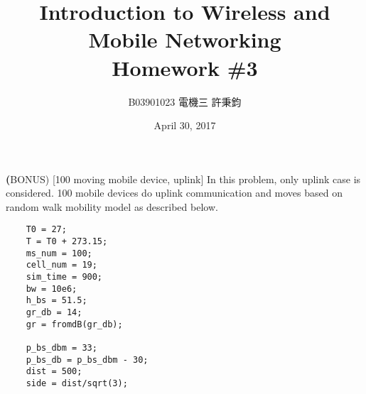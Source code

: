 \documentclass{article}
\title{Introduction to Wireless and Mobile Networking\\ Homework \#3}
\author{B03901023 電機三 許秉鈞}
\date{April 30, 2017} %
\begin{document}
\maketitle

\textbf(BONUS) [100 moving mobile device, uplink] In this problem, only uplink case is considered. 100 mobile devices do uplink communication and moves based on random walk mobility model as described below.

\begin{lstlisting}
    T0 = 27;
    T = T0 + 273.15;
    ms_num = 100;
    cell_num = 19;
    sim_time = 900;
    bw = 10e6;
    h_bs = 51.5;
    gr_db = 14;
    gr = fromdB(gr_db);

    p_bs_dbm = 33;
    p_bs_db = p_bs_dbm - 30;
    dist = 500;
    side = dist/sqrt(3);
\end{lstlisting}
\end{document}
